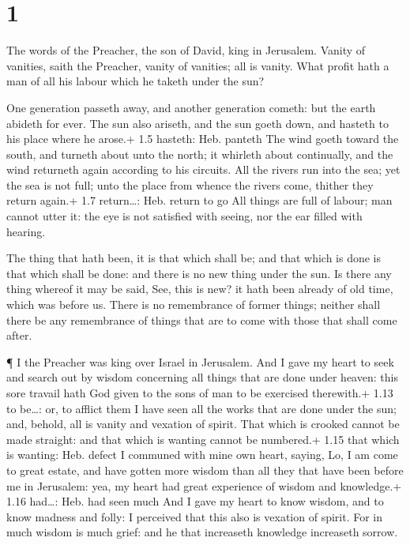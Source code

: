 \hypertarget{section}{%
\section{1}\label{section}}

 The words of the Preacher, the son of David, king in
Jerusalem.  Vanity of vanities, saith the Preacher, vanity
of vanities; all is vanity.  What profit hath a man of all
his labour which he taketh under the sun?

 One generation passeth away, and another generation cometh:
but the earth abideth for ever.  The sun also ariseth, and
the sun goeth down, and hasteth to his place where he arose.+ 1.5
hasteth: Heb. panteth  The wind goeth toward the south, and
turneth about unto the north; it whirleth about continually, and the
wind returneth again according to his circuits.  All the
rivers run into the sea; yet the sea is not full; unto the place from
whence the rivers come, thither they return again.+ 1.7 return\ldots:
Heb. return to go  All things are full of labour; man cannot
utter it: the eye is not satisfied with seeing, nor the ear filled with
hearing.

 The thing that hath been, it is that which shall be; and
that which is done is that which shall be done: and there is no new
thing under the sun.  Is there any thing whereof it may be
said, See, this is new? it hath been already of old time, which was
before us.  There is no remembrance of former things;
neither shall there be any remembrance of things that are to come with
those that shall come after.

 ¶ I the Preacher was king over Israel in Jerusalem.
 And I gave my heart to seek and search out by wisdom
concerning all things that are done under heaven: this sore travail hath
God given to the sons of man to be exercised therewith.+ 1.13 to
be\ldots: or, to afflict them  I have seen all the works
that are done under the sun; and, behold, all is vanity and vexation of
spirit.  That which is crooked cannot be made straight: and
that which is wanting cannot be numbered.+ 1.15 that which is wanting:
Heb. defect  I communed with mine own heart, saying, Lo, I
am come to great estate, and have gotten more wisdom than all they that
have been before me in Jerusalem: yea, my heart had great experience of
wisdom and knowledge.+ 1.16 had\ldots: Heb. had seen much 
And I gave my heart to know wisdom, and to know madness and folly: I
perceived that this also is vexation of spirit.  For in
much wisdom is much grief: and he that increaseth knowledge increaseth
sorrow.

